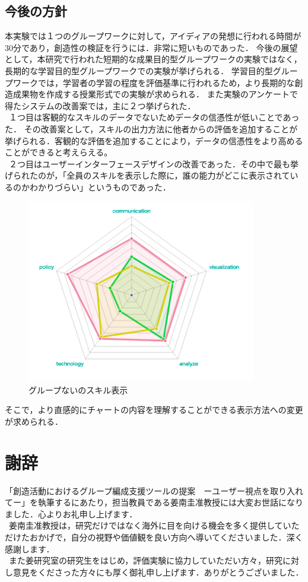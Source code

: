 \documentclass{funthesis}
\begin{document}
\section{今後の方針}
本実験では１つのグループワークに対して，アイディアの発想に行われる時間が30分であり，創造性の検証を行うには．非常に短いものであった．
今後の展望として，本研究で行われた短期的な成果目的型グループワークの実験ではなく，長期的な学習目的型グループワークでの実験が挙げられる．
学習目的型グループワークでは，学習者の学習の程度を評価基準に行われるため，より長期的な創造成果物を作成する授業形式での実験が求められる．
また実験のアンケートで得たシステムの改善案では，主に２つ挙げられた．\\
\ １つ目は客観的なスキルのデータでないためデータの信憑性が低いことであった．
その改善案として，スキルの出力方法に他者からの評価を追加することが挙げられる．客観的な評価を追加することにより，データの信憑性をより高めることができると考えらえる。\\
\ ２つ目はユーザーインターフェースデザインの改善であった．その中で最も挙げられたのが，「全員のスキルを表示した際に，誰の能力がどこに表示されているのかわかりづらい」というものであった．
\begin{figure}[H]
 \centering
   \includegraphics[width=100mm]{figures/groupChart.png}
 \caption{グループないのスキル表示}
 \label{testtest}
\end{figure}

そこで，より直感的にチャートの内容を理解することができる表示方法への変更が求められる．






\chapter*{謝辞}
「創造活動におけるグループ編成支援ツールの提案　ーユーザー視点を取り入れてー」を執筆するにあたり，担当教員である姜南圭准教授には大変お世話になりました．心よりお礼申し上げます．\\
\ 姜南圭准教授は，研究だけではなく海外に目を向ける機会を多く提供していただけたおかげで，自分の視野や価値観を良い方向へ導いてくださいました．深く感謝します．\\
\ また姜研究室の研究生をはじめ，評価実験に協力していただい方々，研究に対し意見をくださった方々にも厚く御礼申し上げます．ありがとうございました．
\end{document}
